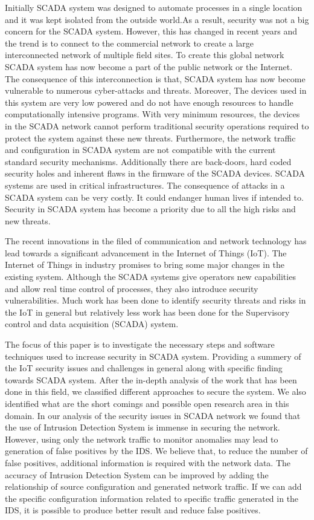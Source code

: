 \documentclass[letterpaper, 10 pt, conference]{ieeeconf}  %
\begin{document}
Initially SCADA system was designed to automate processes in a single location and it was kept isolated from the outside world.As a result, security was not a big concern for the SCADA system. However, this has changed in recent years and the trend is to connect to the commercial network to create a large interconnected network of multiple field sites. To create this global network SCADA system has now become a part of the public network or the Internet. The consequence of this interconnection is that, SCADA system has now become vulnerable to numerous cyber-attacks and threats. Moreover, The devices used in this system are very low powered and do not have enough resources to handle computationally intensive programs. With very minimum resources, the devices in the SCADA network cannot perform traditional security operations required to protect the system against these new threats. Furthermore, the network traffic and configuration in SCADA system are not compatible with the current standard security mechanisms. Additionally there are back-doors, hard coded security holes and inherent flaws in the firmware of the SCADA devices. SCADA systems are used in critical infrastructures. The consequence of attacks in a SCADA system can be very costly. It could endanger human lives if intended to. Security in SCADA system has become a priority due to all the high risks and new threats.

The recent innovations in the filed of communication and network technology has lead towards a significant advancement in the Internet of Things (IoT). The Internet of Things in industry promises to bring some major changes in the existing system. Although the SCADA systems give operators new capabilities and allow real time control of processes, they also introduce security vulnerabilities. Much work has been done to identify security threats and risks in the IoT in general but relatively less work has been done for the Supervisory control and data acquisition (SCADA) system.

The focus of this paper is to investigate the necessary steps and software techniques used to increase security in SCADA system. Providing a summery of the IoT security issues and challenges in general along with specific finding towards SCADA system. After the in-depth analysis of the work that has been done in this field, we classified different approaches to secure the system. We also identified what are the short comings and possible open research area in this domain. In our analysis of the security issues in SCADA network we found that the use of Intrusion Detection System is immense in securing the network. However, using only the network traffic to monitor anomalies may lead to generation of false positives by the IDS. We believe that, to reduce the number of false positives, additional information is required with the network data. The accuracy of Intrusion Detection System can be improved by adding the relationship of source configuration and generated network traffic. If we can add the specific configuration information related to specific traffic generated in the IDS, it is possible to produce better result and reduce false positives. 
\end{document}
